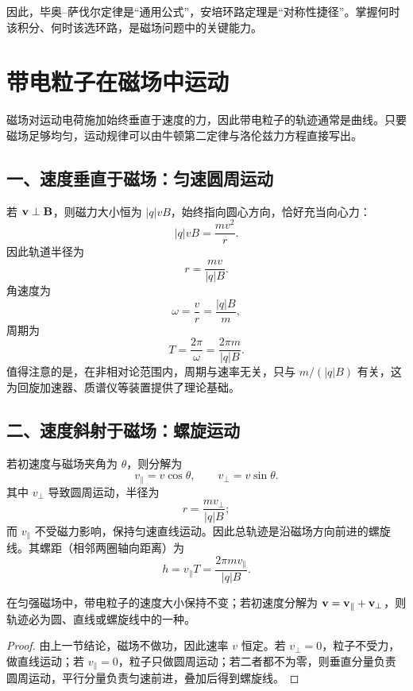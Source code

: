 \begin{remark}
因此，毕奥--萨伐尔定律是“通用公式”，安培环路定理是“对称性捷径”。掌握何时该积分、何时该选环路，是磁场问题中的关键能力。
\end{remark}

\section{带电粒子在磁场中运动}

磁场对运动电荷施加始终垂直于速度的力，因此带电粒子的轨迹通常是曲线。只要磁场足够均匀，运动规律可以由牛顿第二定律与洛伦兹力方程直接写出。

\subsection*{一、速度垂直于磁场：匀速圆周运动}

若 $\vb{v}\perp\vb{B}$，则磁力大小恒为 $|q|vB$，始终指向圆心方向，恰好充当向心力：
\[
  |q|vB=\frac{mv^2}{r}.
\]
因此轨道半径为
\[
  r=\frac{mv}{|q|B}.
\]
角速度为
\[
  \omega=\frac{v}{r}=\frac{|q|B}{m},
\]
周期为
\[
  T=\frac{2\pi}{\omega}=\frac{2\pi m}{|q|B}.
\]
值得注意的是，在非相对论范围内，周期与速率无关，只与 $m/(|q|B)$ 有关，这为回旋加速器、质谱仪等装置提供了理论基础。

\subsection*{二、速度斜射于磁场：螺旋运动}

若初速度与磁场夹角为 $\theta$，则分解为
\[
  v_\parallel=v\cos\theta,
  \qquad
  v_\perp=v\sin\theta.
\]
其中 $v_\perp$ 导致圆周运动，半径为
\[
  r=\frac{mv_\perp}{|q|B};
\]
而 $v_\parallel$ 不受磁力影响，保持匀速直线运动。因此总轨迹是沿磁场方向前进的螺旋线。其螺距（相邻两圈轴向距离）为
\[
  h=v_\parallel T=\frac{2\pi m v_\parallel}{|q|B}.
\]

\begin{theorem}
在匀强磁场中，带电粒子的速度大小保持不变；若初速度分解为 $\vb{v}=\vb{v}_\parallel+\vb{v}_\perp$，则轨迹必为圆、直线或螺旋线中的一种。
\end{theorem}

\begin{proof}
由上一节结论，磁场不做功，因此速率 $v$ 恒定。若 $v_\perp=0$，粒子不受力，做直线运动；若 $v_\parallel=0$，粒子只做圆周运动；若二者都不为零，则垂直分量负责圆周运动，平行分量负责匀速前进，叠加后得到螺旋线。
\end{proof}

